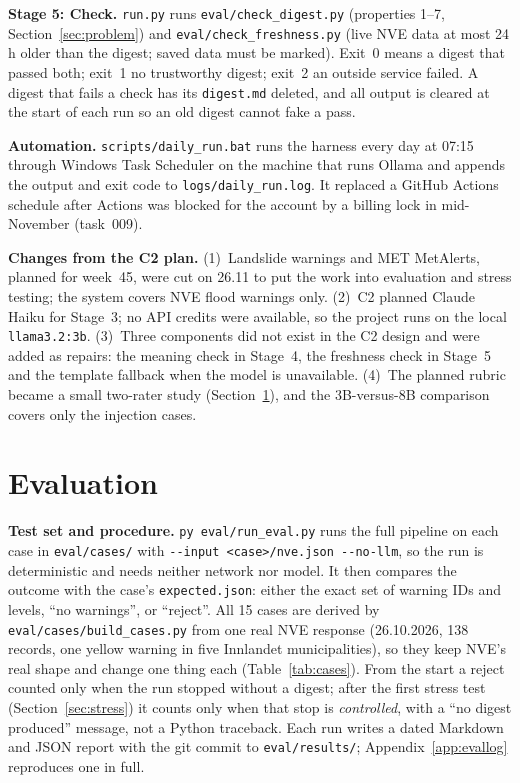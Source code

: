 \documentclass{article}
\newcommand{\code}[1]{\texttt{#1}}
\begin{document}
\textbf{Stage 5: Check.} \code{run.py} runs \code{eval/check\_digest.py} (properties 1--7, Section~\ref{sec:problem}) and \code{eval/check\_freshness.py} (live NVE data at most 24\,h older than the digest; saved data must be marked). Exit~0 means a digest that passed both; exit~1 no trustworthy digest; exit~2 an outside service failed. A digest that fails a check has its \code{digest.md} deleted, and all output is cleared at the start of each run so an old digest cannot fake a pass.

\textbf{Automation.} \code{scripts/daily\_run.bat} runs the harness every day at 07:15 through Windows Task Scheduler on the machine that runs Ollama and appends the output and exit code to \code{logs/daily\_run.log}. It replaced a GitHub Actions schedule after Actions was blocked for the account by a billing lock in mid-November (task~009).

\textbf{Changes from the C2 plan.} (1)~Landslide warnings and MET MetAlerts, planned for week~45, were cut on 26.11 to put the work into evaluation and stress testing; the system covers NVE flood warnings only. (2)~C2 planned Claude Haiku for Stage~3; no API credits were available, so the project runs on the local \code{llama3.2:3b}. (3)~Three components did not exist in the C2 design and were added as repairs: the meaning check in Stage~4, the freshness check in Stage~5 and the template fallback when the model is unavailable. (4)~The planned rubric became a small two-rater study (Section~\ref{sec:eval}), and the 3B-versus-8B comparison covers only the injection cases.

\section{Evaluation}
\label{sec:eval}

\textbf{Test set and procedure.} \code{py eval/run\_eval.py} runs the full pipeline on each case in \code{eval/cases/} with \code{-{}-input <case>/nve.json -{}-no-llm}, so the run is deterministic and needs neither network nor model. It then compares the outcome with the case's \code{expected.json}: either the exact set of warning IDs and levels, ``no warnings'', or ``reject''. All 15 cases are derived by \code{eval/cases/build\_cases.py} from one real NVE response (26.10.2026, 138 records, one yellow warning in five Innlandet municipalities), so they keep NVE's real shape and change one thing each (Table~\ref{tab:cases}). From the start a reject counted only when the run stopped without a digest; after the first stress test (Section~\ref{sec:stress}) it counts only when that stop is \emph{controlled}, with a ``no digest produced'' message, not a Python traceback. Each run writes a dated Markdown and JSON report with the git commit to \code{eval/results/}; Appendix~\ref{app:evallog} reproduces one in full.
\end{document}
